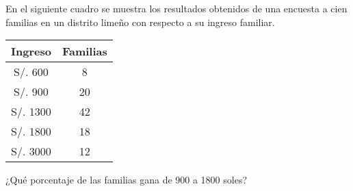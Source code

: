 En el siguiente cuadro se muestra los resultados obtenidos de una encuesta a cien familias en un distrito limeño con respecto a su ingreso familiar.
\begin{center}
	\begin{tabular}{|c|c|}
		\hline 
	\rule[-2ex]{0pt}{5.5ex}	Ingreso & Familias \\ 
		\hline 
	\rule[-1.5ex]{0pt}{4.5ex}	S/. 600 & 8 \\ 
		\hline 
	\rule[-1.5ex]{0pt}{4.5ex}	S/. 900 & 20 \\ 
		\hline 
	\rule[-1.5ex]{0pt}{4.5ex}	S/. 1300 & 42 \\ 
		\hline 
	\rule[-1.5ex]{0pt}{4.5ex}	S/. 1800 & 18 \\ 
		\hline 
	\rule[-1.5ex]{0pt}{4.5ex}	S/. 3000 & 12 \\ 
		\hline 
	\end{tabular} 
\end{center}
¿Qué porcentaje de las familias gana de 900 a 1800 soles?
